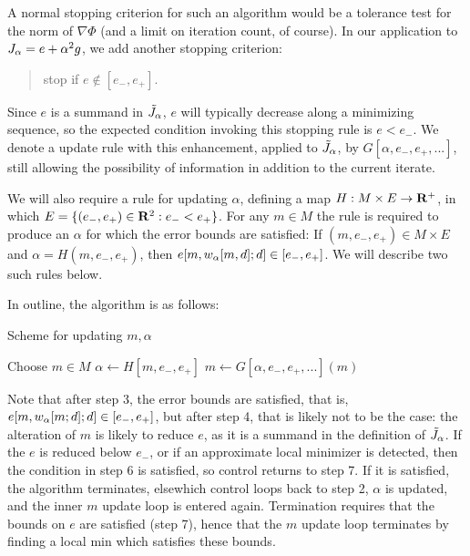 A normal stopping criterion for such an algorithm would be a tolerance
test for the norm of $\nabla \Phi$ (and a limit on iteration count, of
course). In our application to $J_{\alpha} = e + \alpha^2 g$, we add another
stopping criterion:
\begin{quote}
  stop if $e \notin [e_-,e_+]$.
\end{quote}
Since $e$ is a summand in $\tilde{J}_{\alpha}$, $e$ will typically decrease along a
minimizing sequence, so the expected condition invoking this stopping
rule is $e<e_-$. We denote a update rule with this enhancement,
applied to $\tilde{J}_{\alpha}$, by $G[\alpha,e_-,e_+,...]$, still allowing the
possibility of information in addition to the current iterate.

We will also require a rule for updating $\alpha$, defining a map $H: M \times E
\rightarrow {\bf R}^+$, in which $E=\{(e_-,e_+) \in {\bf R}^2:
e_-<e_+\}$. For any $m \in M$ the rule is required to produce an $\alpha$ for which
the error bounds are satisfied: If $(m, e_-, e_+) \in M \times E$ and $\alpha = H(m, e_-,
e_+)$, then $e[m,w_{\alpha}[m,d];d] \in [e_-,e_+]$. We will describe two
such rules below.

In outline, the algorithm is as follows:
\begin{algorithm}[H]
\caption{Scheme for updating $m, \alpha$}
\begin{algorithmic}[1]
  \State Choose $m\in M$
  \Repeat
  \State $\alpha \gets H[m,e_-,e_+]$
  \Repeat
  \State $m \gets G[\alpha,e_-,e_+,...](m)$
\end{algorithmic}
\end{algorithm}
Note that after step 3, the error bounds are satisfied, that is,
$e[m,w_{\alpha}[m;d];d] \in [e_-,e_+]$, but after step 4, that is likely not
to be the case: the alteration of $m$ is likely to reduce $e$, as it is a
summand in the definition of $\tilde{J}_{\alpha}$. If the $e$ is reduced below
$e_-$, or if an approximate local minimizer is detected, then the condition in step 6 is satisfied, so control returns
to step 7. If it is satisfied, the algorithm terminates, elsewhich
control loops back to step 2, $\alpha$ is updated, and the inner $m$
update loop is entered again. Termination requires that the bounds on
$e$ are satisfied (step 7), hence that the $m$ update loop terminates
by finding a local min which satisfies these bounds. 




